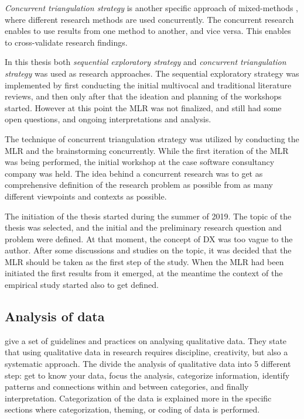 \documentclass[english, 12pt, a4paper, sci, utf8, a-1b, online]{aaltothesis}
\begin{document}
\textit{Concurrent triangulation strategy} is another specific approach of mixed-methods \citep{easterbrook2008selecting}, where different research methods are used concurrently. The concurrent research enables to use results from one method to another, and vice versa. This enables to cross-validate research findings.

In this thesis both \textit{sequential exploratory strategy} and \textit{concurrent triangulation strategy} was used as research approaches. The sequential exploratory strategy was implemented by first conducting the initial multivocal and traditional literature reviews, and then only after that the ideation and planning of the workshops started. However at this point the MLR was not finalized, and still had some open questions, and ongoing interpretations and analysis.

The technique of concurrent triangulation strategy was utilized by conducting the MLR and the brainstorming concurrently. While the first iteration of the MLR was being performed, the initial workshop at the case software consultancy company was held. The idea behind a concurrent research was to get as comprehensive definition of the research problem as possible from as many different viewpoints and contexts as possible.

The initiation of the thesis started during the summer of 2019. The topic of the thesis was selected, and the initial and the preliminary research question and problem were defined. At that moment, the concept of DX was too vague to the author. After some discussions and studies on the topic, it was decided that the MLR should be taken as the first step of the study. When the MLR had been initiated the first results from it emerged, at the meantime the context of the empirical study started also to get defined.

\subsection{Analysis of data}

\cite{analyzing-qualitative-data} give a set of guidelines and practices on analysing qualitative data. They state that using qualitative data in research requires discipline, creativity, but also a systematic approach. The divide the analysis of qualitative data into 5 different step: get to know your data, focus the analysis, categorize information, identify patterns and connections within and between categories, and finally interpretation. Categorization of the data is explained more in the specific sections where categorization, theming, or coding of data is performed.
\end{document}
